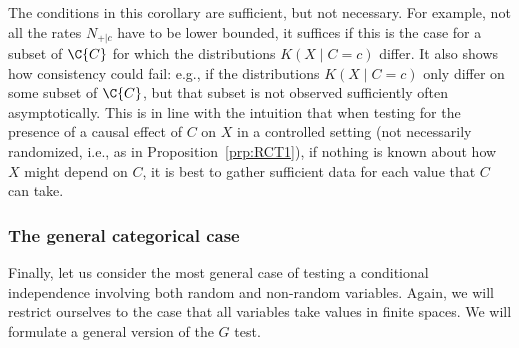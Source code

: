 The conditions in this corollary are sufficient, but not necessary. For example,
not all the rates $N_{+|c}$ have to be lower bounded, it suffices if this is
the case for a subset of $\C{C}$ for which the distributions $K(X \mid C=c)$ differ.
It also shows how consistency could fail: e.g., if the distributions
$K(X \mid C=c)$ only differ on some subset of $\C{C}$, but that subset is not 
observed sufficiently often asymptotically. This is in line with the intuition that
when testing for the presence of a causal effect of $C$ on $X$ in a controlled
setting (not necessarily randomized, i.e., as in Proposition~\ref{prp:RCT1}), if
nothing is known about how $X$ might depend on $C$, it is best to gather sufficient
data for each value that $C$ can take.



\subsubsection{The general categorical case}

Finally, let us consider the most general case of testing a conditional independence involving both random and
non-random variables. Again, we will restrict ourselves to the case that all variables take values in finite spaces.
We will formulate a general version of the $G$ test.


